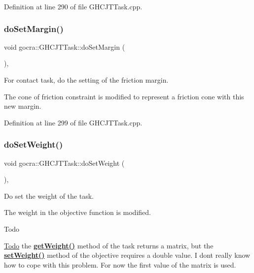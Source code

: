 Definition at line 290 of file G\+H\+C\+J\+T\+Task.\+cpp.

\hypertarget{classgocra_1_1GHCJTTask_ab2a09a00c8e1a2ffef7bd80b40aaeee1}{}\label{classgocra_1_1GHCJTTask_ab2a09a00c8e1a2ffef7bd80b40aaeee1} 
\subsubsection{\texorpdfstring{do\+Set\+Margin()}{doSetMargin()}}
{\footnotesize\ttfamily void gocra\+::\+G\+H\+C\+J\+T\+Task\+::do\+Set\+Margin (\begin{DoxyParamCaption}{ }\end{DoxyParamCaption})\hspace{0.3cm}{\ttfamily [protected]}, {\ttfamily [virtual]}}

For contact task, do the setting of the friction margin.

The cone of friction constraint is modified to represent a friction cone with this new margin. 

Definition at line 299 of file G\+H\+C\+J\+T\+Task.\+cpp.

\hypertarget{classgocra_1_1GHCJTTask_a4966871ab447bff90495c057725e7122}{}\label{classgocra_1_1GHCJTTask_a4966871ab447bff90495c057725e7122} 
\subsubsection{\texorpdfstring{do\+Set\+Weight()}{doSetWeight()}}
{\footnotesize\ttfamily void gocra\+::\+G\+H\+C\+J\+T\+Task\+::do\+Set\+Weight (\begin{DoxyParamCaption}{ }\end{DoxyParamCaption})\hspace{0.3cm}{\ttfamily [protected]}, {\ttfamily [virtual]}}

Do set the weight of the task.

The weight in the objective function is modified.

\begin{DoxyRefDesc}{Todo}
\item[\hyperlink{todo__todo000005}{Todo}]the {\bfseries \hyperlink{classocra_1_1Task_ae2b875972ff294578c1d65feddcf81ac}{get\+Weight()}} method of the task returns a matrix, but the {\bfseries \hyperlink{classocra_1_1Task_a857ee8b756c78d5a90cdc78ae6eb855e}{set\+Weight()}} method of the objective requires a double value. I don\textquotesingle{}t really know how to cope with this problem. For now the first value of the matrix is used. \end{DoxyRefDesc}



